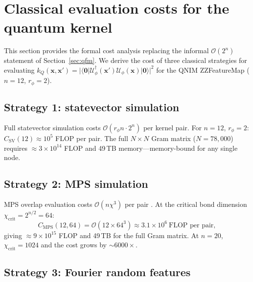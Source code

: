 \documentclass[11pt,a4paper, english]{book}
\theoremstyle{plain}
\theoremstyle{definition}
\numberwithin{equation}{chapter}
\numberwithin{figure}{chapter}
\numberwithin{table}{chapter}
\begin{document}
\section{Classical evaluation costs for the quantum kernel}
\label{app:kernel-cost}

This section provides the formal cost analysis replacing the informal
$\mathcal{O}(2^n)$ statement of Section~\ref{sec:qfm}. We derive the cost
of three classical strategies for evaluating
$k_Q(\mathbf{x},\mathbf{x}')=|\langle\mathbf{0}|
\mathcal{U}_\phi^\dagger(\mathbf{x}')\mathcal{U}_\phi(\mathbf{x})
|\mathbf{0}\rangle|^2$
for the QNIM ZZFeatureMap ($n=12$, $r_\phi=2$).

\subsection{Strategy 1: statevector simulation}
\label{app:cost-statevector}

Full statevector simulation costs $\mathcal{O}(r_\phi n\cdot 2^n)$ per
kernel pair. For $n=12$, $r_\phi=2$: $C_\mathrm{SV}(12)\approx10^5$
FLOP per pair. The full $N\times N$ Gram matrix ($N=78{,}000$) requires
$\approx3\times10^{14}$ FLOP and 49\,TB memory---memory-bound for any
single node.

\subsection{Strategy 2: MPS simulation}
\label{app:cost-mps}

MPS overlap evaluation costs $\mathcal{O}(n\chi^3)$ per pair
\cite{Schreiber_2024_PRR}. At the critical bond dimension
$\chi_\mathrm{crit}=2^{n/2}=64$:
\begin{equation}
  \label{eq:cost_mps_n12}
  C_\mathrm{MPS}(12,64) = \mathcal{O}(12\times64^3)
    \approx 3.1\times10^6~\text{FLOP per pair},
\end{equation}
giving $\approx9\times10^{15}$ FLOP and 49\,TB for the full Gram matrix.
At $n=20$, $\chi_\mathrm{crit}=1024$ and the cost grows by $\sim\!6000\times$.

\subsection{Strategy 3: Fourier random features}
\label{app:cost-rff}
\end{document}
